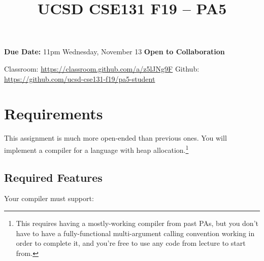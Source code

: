 \documentclass[10pt, oneside]{article}
\title{UCSD CSE131 F19 -- PA5}
\begin{document}
\maketitle 

{\bf Due Date:} 11pm Wednesday, November 13 \hspace{2em} {\bf Open to Collaboration}

Classroom: \url{https://classroom.github.com/a/z5lJNg9F} \hspace{1em} Github: \url{https://github.com/ucsd-cse131-f19/pa5-student}

\section*{Requirements}

This assignment is much more open-ended than previous ones. You will
implement a compiler for a language with heap allocation.\footnote{This requires
having a mostly-working compiler from past PAs, but you don't have to have a
fully-functional multi-argument calling convention working in order to
complete it, and you're free to use any code from lecture to start from.}

\subsection*{Required Features}

Your compiler must support:
\end{document}
